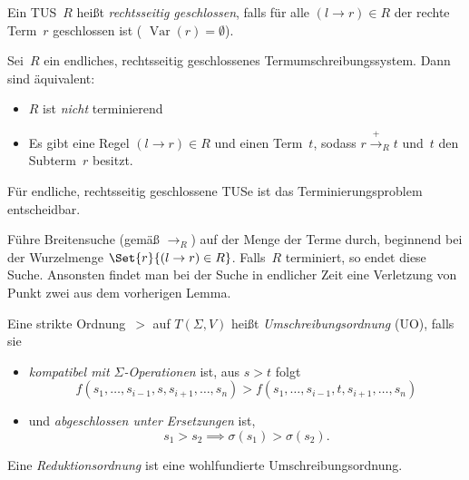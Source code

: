 \documentclass{cheat-sheet}
\newcommand{\strictlyReducesTo}{\xrightarrow{+}}
\DeclareMathOperator{\Var}{Var} %
\begin{document}

\begin{defn}
  Ein TUS~$R$ heißt \emph{rechtsseitig geschlossen}, falls für alle $(l \to r) \in R$ der rechte Term~$r$ geschlossen ist (\dh{} $\Var(r) = \emptyset$).
\end{defn}

\begin{lem}
  Sei~$R$ ein endliches, rechtsseitig geschlossenes Termumschreibungssystem.
  Dann sind äquivalent:
  \begin{itemize}
    \item $R$ ist \textit{nicht} terminierend
    \item Es gibt eine Regel $(l \to r) \in R$ und einen Term~$t$, sodass $r \strictlyReducesTo_R{t}$ und~$t$ den Subterm~$r$ besitzt.
  \end{itemize}
\end{lem}

\begin{thm}
  Für endliche, rechtsseitig geschlossene TUSe ist das Terminierungsproblem entscheidbar.
\end{thm}

\begin{beweisidee}
  Führe Breitensuche (gemäß $\to_R$) auf der Menge der Terme durch, beginnend bei der Wurzelmenge $\Set{r}{(l \to r) \in R}$.
  Falls~$R$ terminiert, so endet diese Suche.
  Ansonsten findet man bei der Suche in endlicher Zeit eine Verletzung von Punkt zwei aus dem vorherigen Lemma.
\end{beweisidee}


\begin{defn}
  Eine strikte Ordnung~$>$ auf $T(\Sigma, V)$ heißt \emph{Umschreibungsordnung} (UO), falls sie
  \begin{itemize}
    \item \textit{kompatibel mit $\Sigma$-Operationen} ist, \dh{} aus $s > t$ folgt
    \[
      f(s_1, \ldots, s_{i-1}, s, s_{i+1}, \ldots, s_n) > f(s_1, \ldots, s_{i-1}, t, s_{i+1}, \ldots, s_n)
    \]
    \item und \textit{abgeschlossen unter Ersetzungen} ist, \dh{}
    \[
      s_1 > s_2 \implies \sigma(s_1) > \sigma(s_2).
    \]
  \end{itemize}
  Eine \emph{Reduktionsordnung} ist eine wohlfundierte Umschreibungsordnung.
\end{defn}
\end{document}
